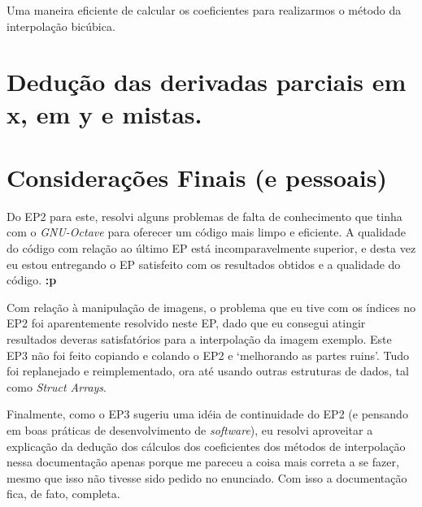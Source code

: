 \documentclass[11pt]{article}
\begin{document}
  Uma maneira eficiente de calcular os coeficientes para realizarmos o método da interpolação bicúbica.

  \pagebreak

  \section{Dedução das derivadas parciais em x, em y e mistas.}

  \section{Considerações Finais (e pessoais)}

  \indent\indent Do EP2 para este, resolvi alguns problemas de falta de conhecimento que tinha com o \textit{GNU-Octave} para oferecer um código mais limpo e eficiente. A qualidade do código
  com relação ao último EP está incomparavelmente superior, e desta vez eu estou entregando o EP satisfeito com os resultados obtidos e a qualidade do código. \textbf{:p}

  Com relação à manipulação de imagens, o problema que eu tive com os índices no EP2 foi aparentemente resolvido neste EP, dado que eu consegui atingir resultados deveras satisfatórios para a interpolação da imagem exemplo.
  Este EP3 não foi feito copiando e colando o EP2 e `melhorando as partes ruins'. Tudo foi replanejado e reimplementado, ora até usando outras estruturas de dados, tal como \textit{Struct Arrays}.

  Finalmente, como o EP3 sugeriu uma idéia de continuidade do EP2 (e pensando em boas práticas de desenvolvimento de \textit{software}), eu resolvi aproveitar a explicação da dedução dos cálculos dos
  coeficientes dos métodos de interpolação nessa documentação apenas porque me pareceu a coisa mais correta a se fazer, mesmo que isso não tivesse sido pedido no enunciado. Com isso a documentação fica, de fato, completa.
\end{document}
